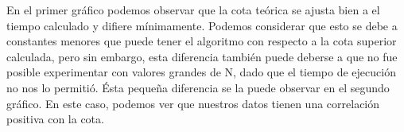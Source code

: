 En el primer gráfico podemos observar que la cota teórica se ajusta bien a el tiempo calculado y difiere mínimamente. Podemos considerar que esto se debe a constantes menores que puede tener el algoritmo con respecto a la cota superior calculada, pero sin embargo, esta diferencia también puede deberse a que no fue posible experimentar con valores grandes de N, dado que el tiempo de ejecución no nos lo permitió.
\newline
Ésta pequeña diferencia se la puede observar en el segundo gráfico. En este caso, podemos ver que nuestros datos tienen una correlación positiva con la cota.
